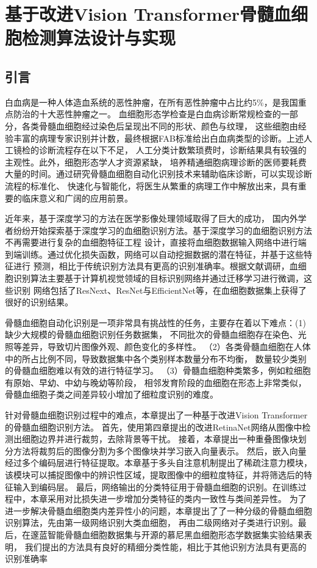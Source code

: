 \chapter{基于改进Vision Transformer骨髓血细胞检测算法设计与实现}
\section{引言}
白血病是一种人体造血系统的恶性肿瘤，在所有恶性肿瘤中占比约5\%，是我国重点防治的十大恶性肿瘤之一。
血细胞形态学检查是白血病诊断常规检查的一部分，各类骨髓血细胞经过染色后呈现出不同的形状、颜色与纹理，
这些细胞由经验丰富的病理专家识别并计数，最终根据FAB标准给出白血病类型的诊断。上述人工镜检的诊断流程存在以下不足，
人工分类计数繁琐费时，诊断结果具有较强的主观性。此外，细胞形态学人才资源紧缺，
培养精通细胞病理诊断的医师要耗费大量的时间。通过研究骨髓血细胞自动化识别技术来辅助临床诊断，可以实现诊断流程的标准化、
快速化与智能化，将医生从繁重的病理工作中解放出来，具有重要的临床意义和广阔的应用前景。

近年来，基于深度学习的方法在医学影像处理领域取得了巨大的成功，
国内外学者纷纷开始探索基于深度学习的血细胞识别方法。基于深度学习的血细胞识别方法不再需要进行复杂的血细胞特征工程
设计，直接将血细胞数据输入网络中进行端到端训练。通过优化损失函数，网络可以自动挖掘数据的潜在特征，并基于这些特征进行
预测，相比于传统识别方法具有更高的识别准确率。根据文献调研，血细胞识别算法主要基于计算机视觉领域的目标识别网络并通过迁移学习进行微调，这些识别
网络包括了ResNext、ResNet与EfficientNet等，在血细胞数据集上获得了很好的识别结果。

骨髓血细胞自动化识别是一项非常具有挑战性的任务，主要存在着以下难点：(1)缺少大规模的骨髓血细胞识别任务数据集，
不同批次的骨髓血细胞存在染色、光照等差异，导致切片图像外观、颜色变化的多样性。
（2）各类骨髓血细胞在人体中的所占比例不同，导致数据集中各个类别样本数量分布不均衡，
数量较少类别的骨髓血细胞难以有效的进行特征学习。
（3）骨髓血细胞种类繁多，例如粒细胞有原始、早幼、中幼与晚幼等阶段，
相邻发育阶段的血细胞在形态上非常类似，骨髓血细胞子类之间差异较小增加了细粒度识别的难度。

针对骨髓血细胞识别过程中的难点，本章提出了一种基于改进Vision Transformer的骨髓血细胞识别方法。
首先，使用第四章提出的改进RetinaNet网络从图像中检测出细胞边界并进行裁剪，去除背景等干扰。
接着，本章提出一种重叠图像块划分方法将裁剪后的图像分割为多个图像块并学习嵌入向量表示。
然后，嵌入向量经过多个编码层进行特征提取。本章基于多头自注意机制提出了稀疏注意力模块，
该模块可以捕捉图像中的辨识性区域，提取图像中的细粒度特征，并将筛选后的特征输入到编码层。
最后，网络输出的分类特征用于骨髓血细胞的识别。在训练过程中，本章采用对比损失进一步增加分类特征的类内一致性与类间差异性。
为了进一步解决骨髓血细胞类内差异性小的问题，本章提出了了一种分级的骨髓血细胞识别算法，先由第一级网络识别大类血细胞，
再由二级网络对子类进行识别。最后，在邃蓝智能骨髓血细胞数据集与开源的慕尼黑血细胞形态学数据集实验结果表明，
我们提出的方法具有良好的精细分类性能，相比于其他识别方法具有更高的识别准确率

